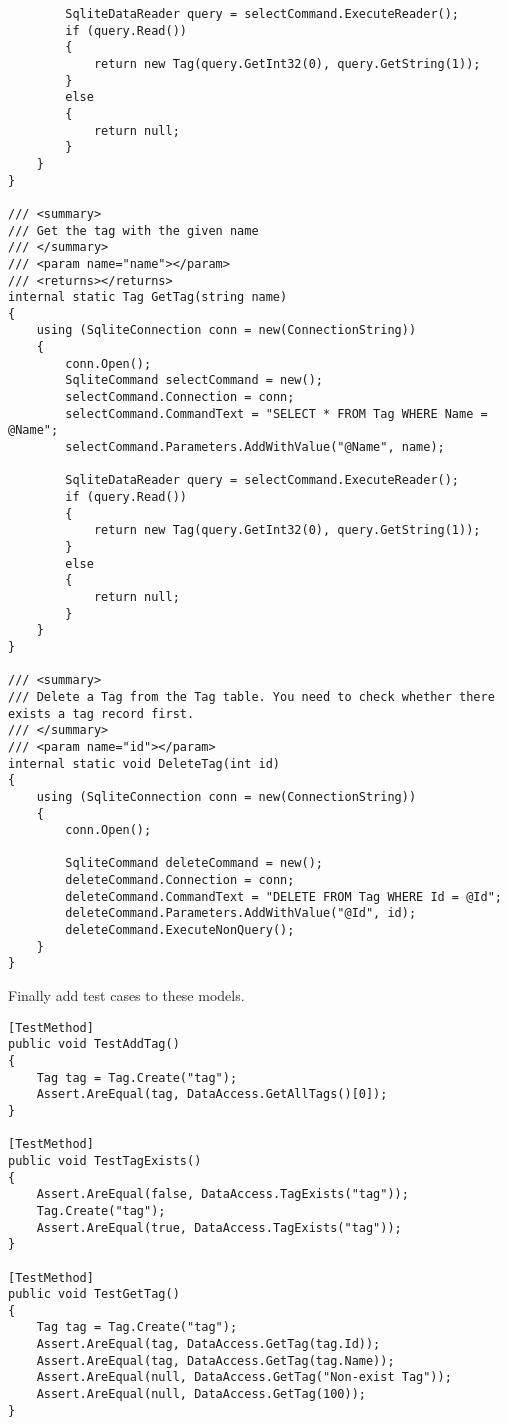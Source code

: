 \documentclass[report.tex]{subfiles}
\begin{document}
\begin{verbatim}
        SqliteDataReader query = selectCommand.ExecuteReader();
        if (query.Read())
        {
            return new Tag(query.GetInt32(0), query.GetString(1));
        }
        else
        {
            return null;
        }
    }
}

/// <summary>
/// Get the tag with the given name
/// </summary>
/// <param name="name"></param>
/// <returns></returns>
internal static Tag GetTag(string name)
{
    using (SqliteConnection conn = new(ConnectionString))
    {
        conn.Open();
        SqliteCommand selectCommand = new();
        selectCommand.Connection = conn;
        selectCommand.CommandText = "SELECT * FROM Tag WHERE Name = @Name";
        selectCommand.Parameters.AddWithValue("@Name", name);

        SqliteDataReader query = selectCommand.ExecuteReader();
        if (query.Read())
        {
            return new Tag(query.GetInt32(0), query.GetString(1));
        }
        else
        {
            return null;
        }
    }
}

/// <summary>
/// Delete a Tag from the Tag table. You need to check whether there exists a tag record first.
/// </summary>
/// <param name="id"></param>
internal static void DeleteTag(int id)
{
    using (SqliteConnection conn = new(ConnectionString))
    {
        conn.Open();

        SqliteCommand deleteCommand = new();
        deleteCommand.Connection = conn;
        deleteCommand.CommandText = "DELETE FROM Tag WHERE Id = @Id";
        deleteCommand.Parameters.AddWithValue("@Id", id);
        deleteCommand.ExecuteNonQuery();
    }
}
\end{verbatim}

Finally add test cases to these models.

\begin{verbatim}
[TestMethod]
public void TestAddTag()
{
    Tag tag = Tag.Create("tag");
    Assert.AreEqual(tag, DataAccess.GetAllTags()[0]);
}

[TestMethod]
public void TestTagExists()
{
    Assert.AreEqual(false, DataAccess.TagExists("tag"));
    Tag.Create("tag");
    Assert.AreEqual(true, DataAccess.TagExists("tag"));
}

[TestMethod]
public void TestGetTag()
{
    Tag tag = Tag.Create("tag");
    Assert.AreEqual(tag, DataAccess.GetTag(tag.Id));
    Assert.AreEqual(tag, DataAccess.GetTag(tag.Name));
    Assert.AreEqual(null, DataAccess.GetTag("Non-exist Tag"));
    Assert.AreEqual(null, DataAccess.GetTag(100));
}
\end{verbatim}
\end{document}
